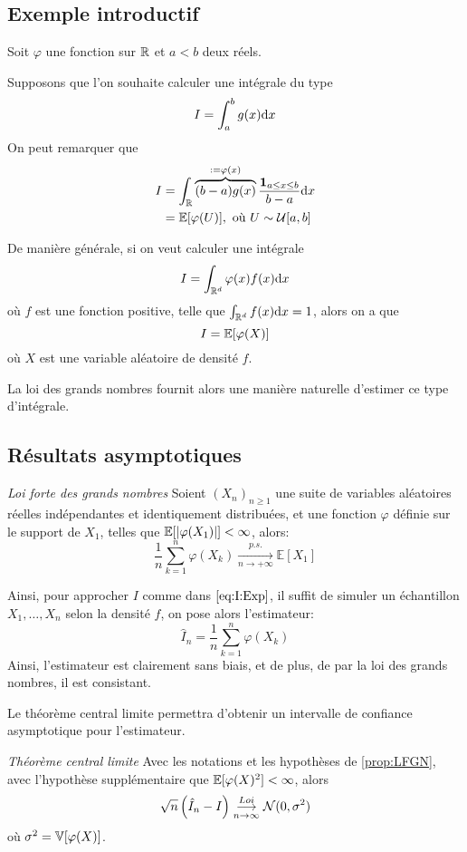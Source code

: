 \subsection{Exemple introductif}

Soit $\varphi$ une fonction sur $\mathbb{R}$ et $a < b$ deux réels.

 Supposons que l'on souhaite calculer une intégrale du type 
$$I = \int_a^b g(x) \text{d} x$$
On peut remarquer que 
\begin{align*}
I &=  \int_{\mathbb{R}} \overbrace{(b - a)g(x)}^{:=\varphi(x)} \frac{\mathbf{1}_{a\leq x\leq b}}{b - a}\text{d} x\\
&= \mathbb{E}[\varphi(U)],\text{ où } U\sim\mathcal{U}[a,b]
\end{align*}

De manière générale, si on veut calculer une intégrale 
$$I = \int_{\mathbb{R}^d} \varphi(x) f(x) \text{d} x$$
où $f$ est une fonction positive, telle que $\int_{\mathbb{R}^d} f(x)\text{d} x = 1$, alors on a que
\begin{equation}
\label{eq:I:Exp}
I = \mathbb{E}[\varphi(X)]
\end{equation}
où $X$ est une variable aléatoire de densité $f$.

La loi des grands nombres fournit alors une manière naturelle d'estimer ce type d'intégrale.

\subsection{Résultats asymptotiques}

\begin{propriete}{\textit{Loi forte des grands nombres}}
\label{prop:LFGN}
Soient $(X_n)_{n\geq1}$ une suite de variables aléatoires réelles indépendantes et identiquement distribuées, et une fonction $\varphi$ définie sur le support de $X_1$, telles que
$\mathbb{E}[\vert \varphi(X_1)\vert] < \infty$, alors:
$$\frac{1}{n}\sum_{k = 1}^n \varphi(X_k) \underset{n \rightarrow + \infty}{\overset{p.s.}{\longrightarrow}}\mathbb{E}[X_1]$$
\end{propriete}

Ainsi, pour approcher $I$ comme dans $\eqref{eq:I:Exp}$, il suffit de simuler un échantillon $X_1,\dots, X_n$ selon la densité $f$, on pose alors l'estimateur:
$$\hat{I}_n = \frac{1}{n}\sum_{k= 1}^n \varphi(X_k)$$
Ainsi, l'estimateur est clairement sans biais, et de plus, de par la loi des grands nombres, il est consistant.

Le théorème central limite permettra d'obtenir un intervalle de confiance asymptotique pour l'estimateur.
\begin{propriete}{\textit{Théorème central limite}}
Avec les notations et les hypothèses de \ref{prop:LFGN}, avec l'hypothèse supplémentaire que $\mathbb{E}[\varphi(X)^2]<\infty$, alors
$$\sqrt{n}\left(\hat{I}_n - I\right) \underset{n\rightarrow \infty}{\overset{Loi}{\longrightarrow}} \mathcal{N} (0, \sigma^2)$$
où $\sigma^2 = \mathbb{V}[\varphi(X)]$.
\end{propriete}

